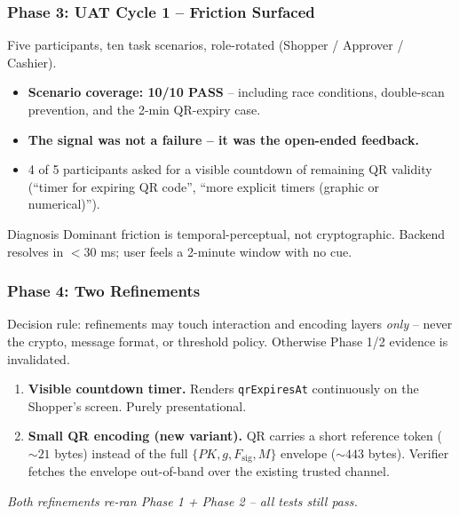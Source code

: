 \documentclass{beamer}
\newcommand{\HL}[1]{\textcolor{emphasis}{#1}}
\begin{document}
\begin{frame}
  \frametitle{Phase 3: UAT Cycle 1 -- Friction Surfaced}
  Five participants, ten task scenarios, role-rotated (Shopper / Approver / Cashier).
  \vspace{0.15cm}
  \begin{itemize}
      \item \textbf{Scenario coverage: 10/10 PASS} -- including race conditions, double-scan prevention, and the 2-min QR-expiry case.
      \item \textbf{The signal was not a failure -- it was the open-ended feedback.}
      \item \HL{4 of 5} participants asked for a visible countdown of remaining QR validity (``timer for expiring QR code'', ``more explicit timers (graphic or numerical)'').
  \end{itemize}
  \vspace{0.15cm}
  \begin{block}{Diagnosis}
    Dominant friction is \HL{temporal-perceptual}, not cryptographic. Backend resolves in ${<}30$ ms; user feels a 2-minute window with no cue.
  \end{block}
\end{frame}

\begin{frame}
  \frametitle{Phase 4: Two Refinements}
  Decision rule: refinements may touch interaction and encoding layers \textit{only} -- never the crypto, message format, or threshold policy. Otherwise Phase 1/2 evidence is invalidated.
  \vspace{0.15cm}
  \begin{enumerate}
    \item \textbf{Visible countdown timer.} Renders \texttt{qrExpiresAt} continuously on the Shopper's screen. Purely presentational.
    \item \textbf{Small QR encoding (new variant).} QR carries a \HL{short reference token} (${\sim}21$ bytes) instead of the full $\{PK, g, F_{\text{sig}}, M\}$ envelope (${\sim}443$ bytes). Verifier fetches the envelope out-of-band over the existing trusted channel.
  \end{enumerate}
  \vspace{0.1cm}
  \textit{Both refinements re-ran Phase 1 + Phase 2 -- all tests still pass.}
\end{frame}
\end{document}
